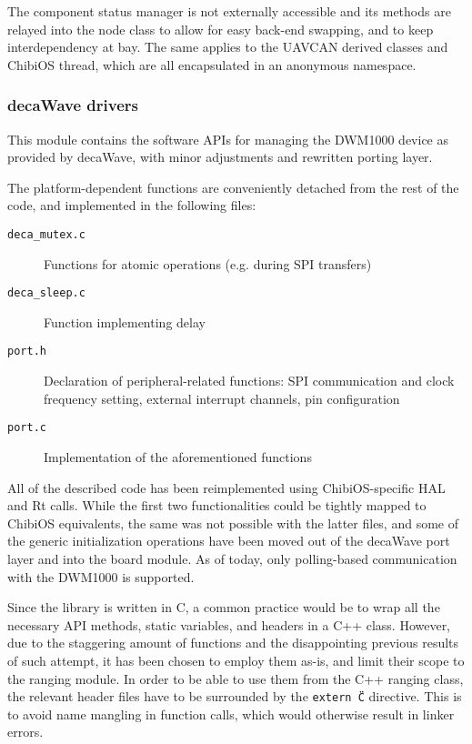 The component status manager is not externally accessible and its methods are relayed into the node class to allow for easy back-end swapping, and to keep interdependency at bay.
The same applies to the UAVCAN derived classes and ChibiOS thread, which are all encapsulated in an anonymous namespace.


\subsubsection{decaWave drivers}
This module contains the software APIs for managing the DWM1000 device as provided by decaWave, with minor adjustments and rewritten porting layer.

The platform-dependent functions are conveniently detached from the rest of the code, and implemented in the following files:
\begin{description}
    \item[\texttt{deca\_mutex.c}] Functions for atomic operations (e.g. during SPI transfers)
    \item[\texttt{deca\_sleep.c}] Function implementing delay
    \item[\texttt{port.h}] Declaration of peripheral-related functions: SPI communication and clock frequency setting, external interrupt channels, pin configuration
    \item[\texttt{port.c}] Implementation of the aforementioned functions
\end{description}

All of the described code has been reimplemented using ChibiOS-specific HAL and Rt calls.
While the first two functionalities could be tightly mapped to ChibiOS equivalents, the same was not possible with the latter files, and  some of the generic initialization operations have been moved out of the decaWave port layer and into the board module.
As of today, only polling-based communication with the DWM1000 is supported.

Since the library is written in C, a common practice would be to wrap all the necessary API methods, static variables, and headers in a C++ class.
However, due to the staggering amount of functions and the disappointing previous results of such attempt, it has been chosen to employ them as-is, and limit their scope to the ranging module.
In order to be able to use them from the C++ ranging class, the relevant header files have to be surrounded by the \texttt{extern \"C\"} directive.
This is to avoid name mangling in function calls, which would otherwise result in linker errors.


